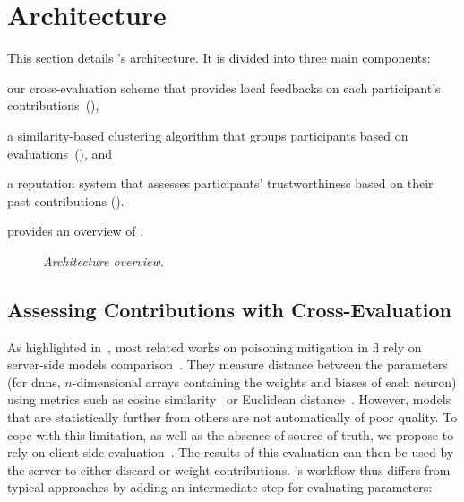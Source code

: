 \section{Architecture\label{sec:radar.archi}}

This section details \thecontrib's architecture.
It is divided into three main components:
\begin{enumerate*}[label=(\emph{\roman*})]
    \item our cross-evaluation scheme that provides local feedbacks on each participant's contributions~(),
    \item a similarity-based clustering algorithm that groups participants based on evaluations~(), and 
    \item a reputation system that assesses participants' trustworthiness based on their past contributions ().
\end{enumerate*}
 provides an overview of \thecontrib.

\begin{figure}
    \centering

    

    \caption{\label{fig:radar.archi}\emph{Architecture overview.}}
\end{figure}


\subsection{Assessing Contributions with Cross-Evaluation\label{sec:radar.archi.xeval}}

As highlighted in~, most related works on poisoning mitigation in \gls{fl} rely on server-side models comparison~\cite{fung_LimitationsFederatedLearning_2020,awan_CONTRADefendingPoisoning_2021}. 
They measure distance between the parameters (for \glspl{dnn}, $n$-dimensional arrays containing the weights and biases of each neuron) using metrics such as cosine similarity~\cite{fung_LimitationsFederatedLearning_2020} or Euclidean distance~\cite{ma_ShieldFLMitigatingModel_2022}.
However, models that are statistically further from others are not automatically of poor quality.
To cope with this limitation, as well as the absence of source of truth, we propose to rely on client-side evaluation~\cite{zhao_ShieldingCollaborativeLearning_2020}.
The results of this evaluation can then be used by the server to either discard or weight contributions.
\thecontrib's workflow thus differs from typical approaches by adding an intermediate step for evaluating parameters:

